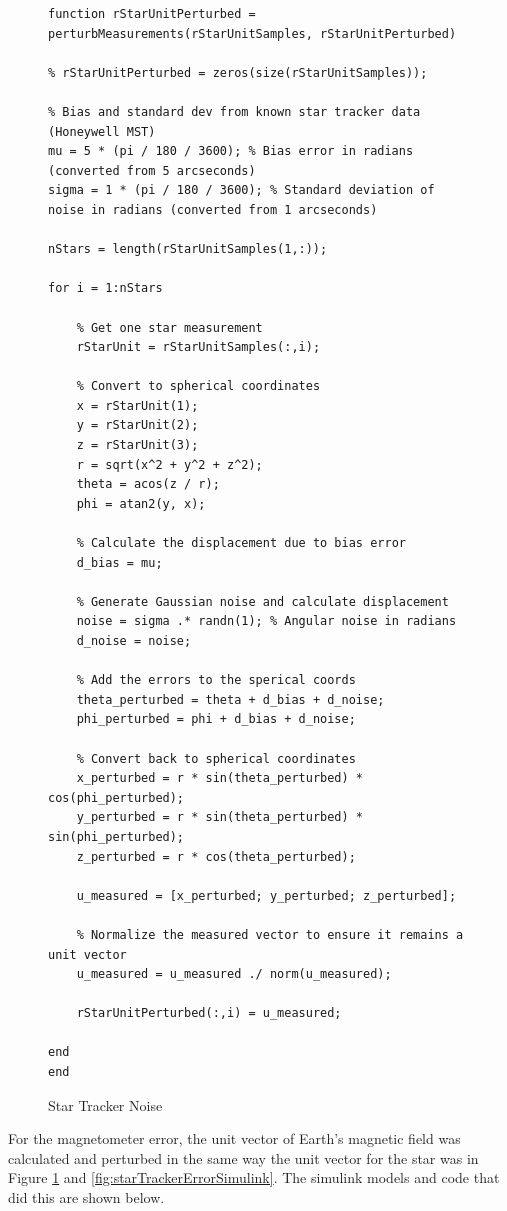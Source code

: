 \begin{figure} [H]
    \centering
    \begin{lstlisting}
function rStarUnitPerturbed = perturbMeasurements(rStarUnitSamples, rStarUnitPerturbed)

% rStarUnitPerturbed = zeros(size(rStarUnitSamples));

% Bias and standard dev from known star tracker data (Honeywell MST)
mu = 5 * (pi / 180 / 3600); % Bias error in radians (converted from 5 arcseconds)
sigma = 1 * (pi / 180 / 3600); % Standard deviation of noise in radians (converted from 1 arcseconds)

nStars = length(rStarUnitSamples(1,:));

for i = 1:nStars

    % Get one star measurement
    rStarUnit = rStarUnitSamples(:,i);

    % Convert to spherical coordinates
    x = rStarUnit(1);
    y = rStarUnit(2); 
    z = rStarUnit(3);
    r = sqrt(x^2 + y^2 + z^2);
    theta = acos(z / r);
    phi = atan2(y, x);
    
    % Calculate the displacement due to bias error
    d_bias = mu;
    
    % Generate Gaussian noise and calculate displacement
    noise = sigma .* randn(1); % Angular noise in radians
    d_noise = noise;
    
    % Add the errors to the sperical coords
    theta_perturbed = theta + d_bias + d_noise;
    phi_perturbed = phi + d_bias + d_noise;
    
    % Convert back to spherical coordinates
    x_perturbed = r * sin(theta_perturbed) * cos(phi_perturbed);
    y_perturbed = r * sin(theta_perturbed) * sin(phi_perturbed);
    z_perturbed = r * cos(theta_perturbed);
    
    u_measured = [x_perturbed; y_perturbed; z_perturbed];
    
    % Normalize the measured vector to ensure it remains a unit vector
    u_measured = u_measured ./ norm(u_measured);

    rStarUnitPerturbed(:,i) = u_measured;
    
end
end
    \end{lstlisting}
    \caption{Star Tracker Noise}
    \label{fig:starTrackerNoise}
\end{figure}

For the magnetometer error, the unit vector of Earth's magnetic field was calculated and perturbed in the same way the unit vector for the star was in Figure \ref{fig:starTrackerNoise} and \ref{fig:starTrackerErrorSimulink}. The simulink models and code that did this are shown below.

